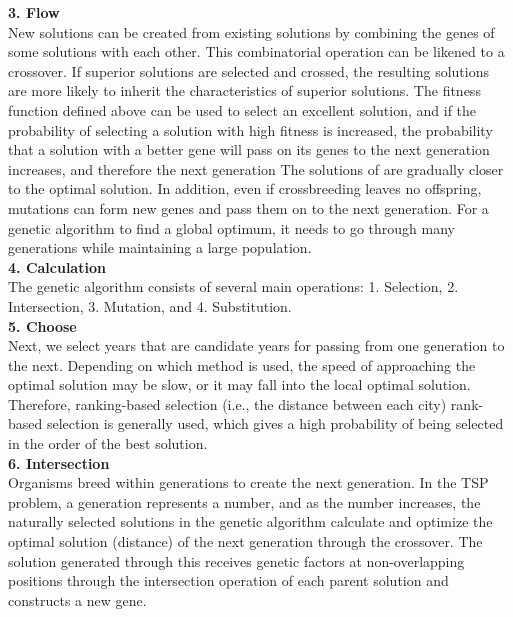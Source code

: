 \documentclass[12pt]{article}
\begin{document}
\textbf{3. Flow} \\

New solutions can be created from existing solutions by combining the genes of some solutions with each other. This combinatorial operation can be likened to a crossover. If superior solutions are selected and crossed, the resulting solutions are more likely to inherit the characteristics of superior solutions. The fitness function defined above can be used to select an excellent solution, and if the probability of selecting a solution with high fitness is increased, the probability that a solution with a better gene will pass on its genes to the next generation increases, and therefore the next generation The solutions of are gradually closer to the optimal solution. In addition, even if crossbreeding leaves no offspring, mutations can form new genes and pass them on to the next generation. For a genetic algorithm to find a global optimum, it needs to go through many generations while maintaining a large population. \\

\textbf{4. Calculation} \\

The genetic algorithm consists of several main operations: 1. Selection, 2. Intersection, 3. Mutation, and 4. Substitution. \\

\textbf{5. Choose} \\

Next, we select years that are candidate years for passing from one generation to the next. Depending on which method is used, the speed of approaching the optimal solution may be slow, or it may fall into the local optimal solution. Therefore, ranking-based selection (i.e., the distance between each city) rank-based selection is generally used, which gives a high probability of being selected in the order of the best solution. \\

\textbf{6. Intersection} \\

Organisms breed within generations to create the next generation. In the TSP problem, a generation represents a number, and as the number increases, the naturally selected solutions in the genetic algorithm calculate and optimize the optimal solution (distance) of the next generation through the crossover. The solution generated through this receives genetic factors at non-overlapping positions through the intersection operation of each parent solution and constructs a new gene.\\
\end{document}
